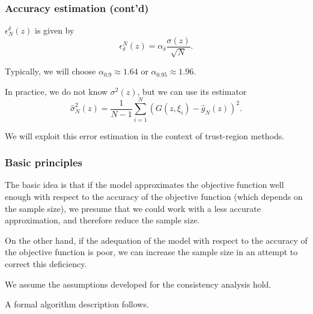 \documentclass{beamer}
\begin{document}
\begin{frame}
\frametitle{Accuracy estimation (cont'd)}

$\epsilon^{\delta}_N(z)$ is given by
\[
\epsilon_{\delta}^N(z) = \alpha_{\delta} \frac{\sigma(z)}{\sqrt{N}}.
\]

\mbox{}

Typically, we will choose $\alpha_{0.9} \approx 1.64$ or $\alpha_{0.95} \approx 1.96$.

\mbox{}

In practice, we do not know $\sigma^2(z)$, but we can use its estimator
\[
\hat{\sigma}^2_N(z) = \frac{1}{N-1}\sum_{i = 1}^N ( G(z,\xi_i) -
\hat{g}_N(z))^2.
\]

\mbox{}

We will exploit this error estimation in the context of trust-region methods.


\end{frame}

\begin{frame}
\frametitle{Basic principles}

The basic idea is that if the model approximates the objective function well enough with respect to the accuracy of the objective function (which depends on the sample size), we presume that we could work with a less accurate approximation, and therefore reduce the sample size.

\mbox{}

On the other hand, if the adequation of the model with respect to the accuracy of the objective function is poor, we can increase the sample size in an attempt to correct this deficiency.

\mbox{}

We assume the assumptions developed for the consistency analysis hold.

\mbox{}

A formal algorithm description follows.

\end{frame}
\end{document}
